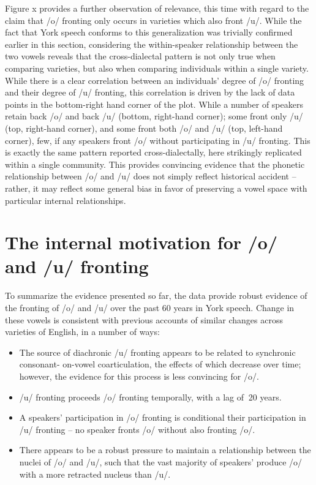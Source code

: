 \documentclass[12pt]{article}
\begin{document}
Figure x provides a further observation of relevance, this time with regard to the claim that /o/ fronting only occurs in varieties which also front /u/. While the fact that York speech conforms to this generalization was trivially confirmed earlier in this section, considering the within-speaker relationship between the two vowels reveals that the cross-dialectal pattern is not only true when comparing varieties, but also when comparing individuals within a single variety.  While there is a clear correlation between an individuals' degree of /o/ fronting and their degree of /u/ fronting, this correlation is driven by the lack of data points in the bottom-right hand corner of the plot. While a number of speakers retain back /o/ and back /u/ (bottom, right-hand corner); some front only /u/ (top, right-hand corner), and some front both /o/ and /u/ (top, left-hand corner), few, if any speakers front /o/ without participating in /u/ fronting. This is exactly the same pattern reported cross-dialectally, here strikingly replicated within a single community. This provides convincing evidence that the phonetic relationship between /o/ and /u/ does not simply reflect historical accident -- rather, it may reflect some general bias in favor of preserving a vowel space with particular internal relationships.

\section{The internal motivation for /o/ and /u/ fronting}
To summarize the evidence presented so far, the data provide robust evidence of the fronting of /o/ and /u/ over the past 60 years in York speech. Change in these vowels is consistent with previous accounts of similar changes across varieties of English, in a number of ways:

\begin{itemize}
\item{The source of diachronic /u/ fronting appears to be related to synchronic consonant- on-vowel coarticulation, the effects of which decrease over time; however, the evidence for this process is less convincing for /o/.}

\item{/u/ fronting proceeds /o/ fronting temporally, with a lag of $~$20 years.}

\item{A speakers' participation in /o/ fronting is conditional their participation in /u/ fronting -- no speaker fronts /o/ without also fronting /o/.}

\item{There appears to be a robust pressure to maintain a relationship between the nuclei of /o/ and /u/, such that the vast majority of speakers' produce /o/ with a more retracted nucleus than /u/.}
\end{itemize}
\end{document}
